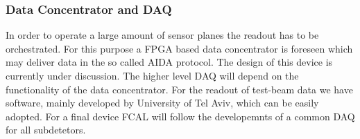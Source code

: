 \subsubsection{Data Concentrator and DAQ}

In order to operate a large amount of sensor planes the readout has to be orchestrated.
For this purpose a FPGA based data concentrator is foreseen
which may deliver data in the so called AIDA protocol. The design of this device is currently under discussion.
The higher level DAQ will depend on the functionality of the data concentrator.
For the readout of test-beam data we have software, mainly developed by University of Tel Aviv,
which can be easily adopted.
For a final device FCAL will follow the developemnts of a common DAQ for all subdetetors.


